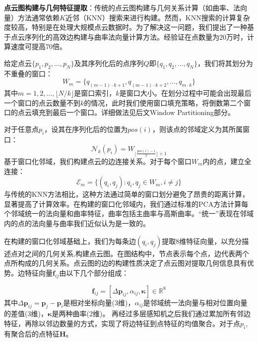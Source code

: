 \documentclass[preprint,12pt]{elsarticle}
\begin{document}
\textbf{点云图构建与几何特征提取}：传统的点云图构建与几何关系计算（如曲率、法向量）方法通常依赖$K$近邻（KNN）搜索来进行构建。然而，KNN搜索的计算复杂度较高，特别是在处理大规模点云数据时。为了解决这一问题，我们提出了一种基于点云序列化的高效边构建与曲率法向量计算方法。经验证在点数量为20万时，计算速度可提高70倍。


给定点云$\{p_1, p_2, \ldots, p_N\}$及其序列化后的点序列$Q$即$\{q_1, q_2, \ldots, q_N\}$，我们将其划分为不重叠的窗口：
\begin{equation}
	W_m = \{q_{(m-1) \cdot k + 1}, q_{(m-1) \cdot k + 2}, \ldots, q_{m \cdot k}\}
\end{equation}
其中$m = 1, 2, \ldots, \lfloor N/k \rfloor$是窗口索引，$k$是窗口大小。在划分过程中可能会出现最后一个窗口的点云数量不到$k$的情况，此时我们使用窗口填充策略，将倒数第二个窗口的点云填充到最后一个窗口。详细做法见后文Window Partitioning部分。

对于任意点$p_i$，设其在序列化后的位置为$pos(i)$，则该点的邻域定义为其所属窗口：
\begin{equation}
	\mathcal{N}_k(p_i) = W_{\lfloor \frac{pos(i)-1}{k} \rfloor + 1}
\end{equation}
基于窗口化邻域，我们构建点云的边连接关系。对于每个窗口$W_m$内的点，建立全连接：
\begin{equation}
	\mathcal{E}_m = \{(q_i, q_j) : q_i, q_j \in W_m, i \neq j\}
\end{equation}
与传统的KNN方法相比，这种方法通过简单的窗口划分避免了昂贵的距离计算，显著提高了计算效率。在构建的窗口化邻域内，我们通过标准的PCA方法计算每个邻域统一的法向量和曲率特征，曲率包括主曲率与高斯曲率。“统一”表现在邻域内的点的法向量与曲率我们近似认为是一致的。


在构建的窗口化邻域基础上，我们为每条边$(q_i, q_j)$提取8维特征向量，以充分描述点对之间的几何关系,构建点云图。在图结构中，节点表示每个点，边代表两个点所构成的几何关系。点云图的边的构建性质决定了点云图对提取几何信息具有优势。边特征向量$\mathbf{f}_{ij}$由以下几个部分组成：
 
\begin{equation}
	\mathbf{f}_{ij} = [\Delta\mathbf{p}_{ij}, \alpha_{ij},  \boldsymbol{\kappa}] \in \mathbb{R}^8
\end{equation}
其中$\Delta\mathbf{p}_{ij} = \mathbf{p}_j - \mathbf{p}_i$是相对坐标向量(3维)，$\alpha_{ij}$是邻域统一法向量与相对位置向量的差值(3维)，$\boldsymbol{\kappa}$是两种曲率(2维)。
再经过多层感知机之后我们通过累加所有邻边特征，再除以邻边数量的方式，实现了将边特征到点特征的均值聚合。对于点$p_i$,有聚合后的点特征$\mathbf{H}$。
\end{document}
